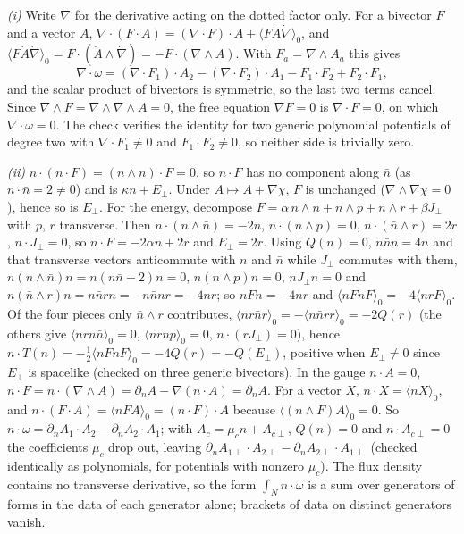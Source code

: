 \emph{(i)} Write $\dot\nabla$ for the derivative acting on the dotted factor only. For a bivector $F$ and a vector $A$, $\nabla\cdot(F\cdot A) = (\nabla\cdot F)\cdot A + \langle F\dot A\dot\nabla\rangle_{0}$, and $\langle F\dot A\dot\nabla\rangle_{0} = F\cdot(\dot A\wedge\dot\nabla) = -F\cdot(\nabla\wedge A)$. With $F_{a} = \nabla\wedge A_{a}$ this gives
\[
\nabla\cdot\omega = (\nabla\cdot F_{1})\cdot A_{2} - (\nabla\cdot F_{2})\cdot A_{1} - F_{1}\cdot F_{2} + F_{2}\cdot F_{1},
\]
and the scalar product of bivectors is symmetric, so the last two terms cancel. Since $\nabla\wedge F = \nabla\wedge\nabla\wedge A = 0$, the free equation $\nabla F = 0$ is $\nabla\cdot F = 0$, on which $\nabla\cdot\omega = 0$. The check verifies the identity for two generic polynomial potentials of degree two with $\nabla\cdot F_{1} \ne 0$ and $F_{1}\cdot F_{2} \ne 0$, so neither side is trivially zero.

\emph{(ii)} $n\cdot(n\cdot F) = (n\wedge n)\cdot F = 0$, so $n\cdot F$ has no component along $\bar n$ (as $n\cdot\bar n = 2 \ne 0$) and is $\kappa n + E_{\perp}$. Under $A \mapsto A + \nabla\chi$, $F$ is unchanged ($\nabla\wedge\nabla\chi = 0$), hence so is $E_{\perp}$. For the energy, decompose $F = \alpha\,n\wedge\bar n + n\wedge p + \bar n\wedge r + \beta J_{\perp}$ with $p$, $r$ transverse. Then $n\cdot(n\wedge\bar n) = -2n$, $n\cdot(n\wedge p) = 0$, $n\cdot(\bar n\wedge r) = 2r$, $n\cdot J_{\perp} = 0$, so $n\cdot F = -2\alpha n + 2r$ and $E_{\perp} = 2r$. Using $Q(n) = 0$, $n\bar nn = 4n$ and that transverse vectors anticommute with $n$ and $\bar n$ while $J_{\perp}$ commutes with them, $n(n\wedge\bar n)n = n(n\bar n - 2)n = 0$, $n(n\wedge p)n = 0$, $nJ_{\perp}n = 0$ and $n(\bar n\wedge r)n = n\bar nrn = -n\bar nnr = -4nr$; so $nFn = -4nr$ and $\langle nFnF\rangle_{0} = -4\langle nrF\rangle_{0}$. Of the four pieces only $\bar n\wedge r$ contributes, $\langle nr\bar nr\rangle_{0} = -\langle n\bar nrr\rangle_{0} = -2Q(r)$ (the others give $\langle nrn\bar n\rangle_{0} = 0$, $\langle nrnp\rangle_{0} = 0$, $n\cdot(rJ_{\perp}) = 0$), hence $n\cdot T(n) = -\tfrac12\langle nFnF\rangle_{0} = -4Q(r) = -Q(E_{\perp})$, positive when $E_{\perp} \ne 0$ since $E_{\perp}$ is spacelike (checked on three generic bivectors). In the gauge $n\cdot A = 0$, $n\cdot F = n\cdot(\nabla\wedge A) = \partial_{n}A - \nabla(n\cdot A) = \partial_{n}A$. For a vector $X$, $n\cdot X = \langle nX\rangle_{0}$, and $n\cdot(F\cdot A) = \langle nFA\rangle_{0} = (n\cdot F)\cdot A$ because $\langle (n\wedge F)A\rangle_{0} = 0$. So $n\cdot\omega = \partial_{n}A_{1}\cdot A_{2} - \partial_{n}A_{2}\cdot A_{1}$; with $A_{c} = \mu_{c}n + A_{c\perp}$, $Q(n) = 0$ and $n\cdot A_{c\perp} = 0$ the coefficients $\mu_{c}$ drop out, leaving $\partial_{n}A_{1\perp}\cdot A_{2\perp} - \partial_{n}A_{2\perp}\cdot A_{1\perp}$ (checked identically as polynomials, for potentials with nonzero $\mu_{c}$). The flux density contains no transverse derivative, so the form $\int_{N}n\cdot\omega$ is a sum over generators of forms in the data of each generator alone; brackets of data on distinct generators vanish.

